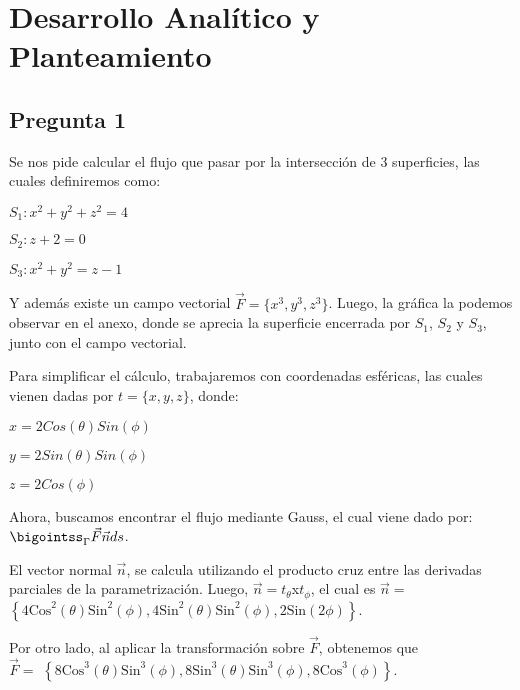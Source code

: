 \documentclass[11pt,letterpaper]{article}
\begin{document}


\section{Desarrollo Analítico y Planteamiento}
\subsection{Pregunta 1}

Se nos pide calcular el flujo que pasar por la intersección de 3 superficies, las cuales definiremos como:

\begin{center}$S_1: x^2+y^2+z^2=4$\end{center}
\begin{center}$S_2: z+2=0$\end{center}
\begin{center}$S_3: x^2+y^2=z-1$\end{center}

Y además existe un campo vectorial $\vec{F}=\{x^3,y^3,z^3\}$. Luego, la gráfica la podemos observar en el anexo, donde se aprecia la superficie encerrada por $S_1$, $S_2$ y $S_3$, junto con el campo vectorial.

Para simplificar el cálculo, trabajaremos con coordenadas esféricas, las cuales vienen dadas por $t=\{x,y,z\}$, donde:

\begin{center}$x=2Cos(\theta)Sin(\phi)$\end{center}
\begin{center}$y=2Sin(\theta)Sin(\phi)$\end{center}
\begin{center}$z=2Cos(\phi)$\end{center}

Ahora, buscamos encontrar el flujo mediante Gauss, el cual viene dado por: $\bigointss_\Gamma \vec{F}\vec{n}ds$.

El vector normal $\vec{n}$, se calcula utilizando el producto cruz entre las derivadas parciales de la parametrización. Luego, $\vec{n}=t_\theta$x$t_\phi$, el cual es $\vec{n}=$\noindent\(\left\{4 \text{Cos}^2(\theta ) \text{Sin}^2(\phi),4 \text{Sin}^2(\theta ) \text{Sin}^2(\phi),2 \text{Sin}(2 \phi )\right\}\).

Por otro lado, al aplicar la transformación sobre $\vec{F}$, obtenemos que\\ $\vec{F}=$ \noindent\(\left\{8 \text{Cos}^3(\theta) \text{Sin}^3(\phi ),8 \text{Sin}^3(\theta ) \text{Sin}^3(\phi),8 \text{Cos}^3(\phi)\right\}\).
\\
\end{document}
